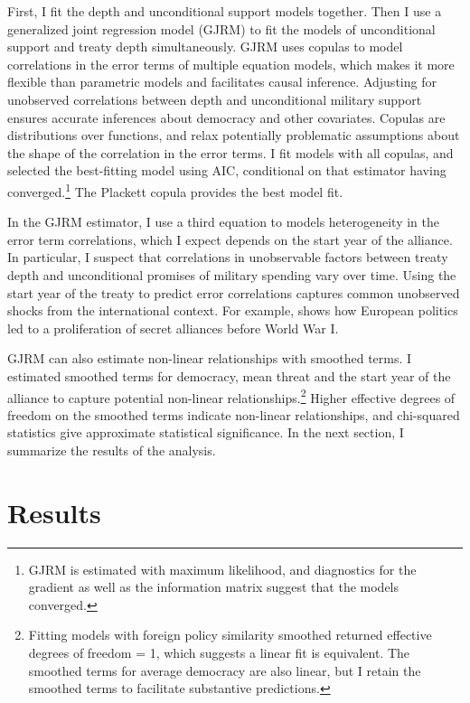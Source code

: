 \documentclass[12pt]{article}
\begin{document}
First, I fit the depth and unconditional support models together.
Then I use a generalized joint regression model (GJRM) \citep{Braumoelleretal2018} to fit the models of unconditional support and treaty depth simultaneously.
GJRM uses copulas to model correlations in the error terms of multiple equation models, which makes it more flexible than parametric models and facilitates causal inference. 
Adjusting for unobserved correlations between depth and unconditional military support ensures accurate inferences about democracy and other covariates. 
Copulas are distributions over functions, and relax potentially problematic assumptions about the shape of the correlation in the error terms. 
I fit models with all copulas, and selected the best-fitting model using AIC, conditional on that estimator having converged.\footnote{GJRM is estimated with maximum likelihood, and diagnostics for the gradient as well as the information matrix suggest that the models converged.} 
The Plackett copula provides the best model fit.


In the GJRM estimator, I use a third equation to models heterogeneity in the error term correlations, which I expect depends on the start year of the alliance. 
In particular, I suspect that correlations in unobservable factors between treaty depth and unconditional promises of military spending vary over time. 
Using the start year of the treaty to predict error correlations captures common unobserved shocks from the international context. 
For example, \citet{Kuo2019} shows how European politics led to a proliferation of secret alliances before World War I. 


GJRM can also estimate non-linear relationships with smoothed terms. 
I estimated smoothed terms for democracy, mean threat and the start year of the alliance to capture potential non-linear relationships.\footnote{Fitting models with foreign policy similarity smoothed returned effective degrees of freedom = 1, which suggests a linear fit is equivalent. The smoothed terms for average democracy are also linear, but I retain the smoothed terms to facilitate substantive predictions.}  
Higher effective degrees of freedom on the smoothed terms indicate non-linear relationships, and chi-squared statistics give approximate statistical significance. 
In the next section, I summarize the results of the analysis. 



\section{Results}
\end{document}
